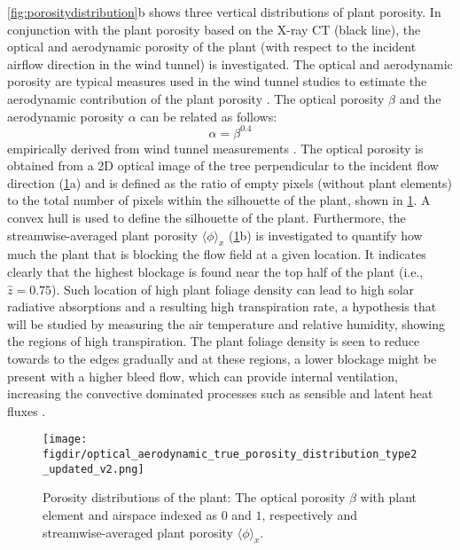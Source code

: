 \cref{fig:porositydistribution}b shows three vertical distributions of plant porosity. In conjunction with the plant porosity based on the X-ray CT (black line), the optical and aerodynamic porosity of the plant (with respect to the incident airflow direction in the wind tunnel) is investigated. The optical and aerodynamic porosity are typical measures used in the wind tunnel studies to estimate the aerodynamic contribution of the plant porosity \citep{Grant1998,Guan2003,Manickathan2018b}. The optical porosity $\beta$ and the aerodynamic porosity $\alpha$ can be related as follows:
\begin{equation}
\alpha = \beta^{0.4}
\end{equation}
empirically derived from wind tunnel measurements \citep{Guan2003}. The optical porosity is obtained from a 2D optical image of the tree perpendicular to the incident flow direction (\cref{fig:porosities}a) and is defined as the ratio of empty pixels (without plant elements) to the total number of pixels within the silhouette of the plant, shown in \cref{fig:porosities}. A convex hull is used to define the silhouette of the plant. Furthermore, the streamwise-averaged plant porosity $\langle \phi \rangle _x$ (\cref{fig:porosities}b) is investigated to quantify how much the plant that is blocking the flow field at a given location. It indicates clearly that the highest blockage is found near the top half of the plant (i.e.,  $\hat{z}=0.75$). Such location of high plant foliage density can lead to high solar radiative absorptions and a resulting high transpiration rate, a hypothesis that will be studied by measuring the air temperature and relative humidity, showing the regions of high transpiration. The plant foliage density is seen to reduce towards to the edges gradually and at these regions, a lower blockage might be present with a higher bleed flow, which can provide internal ventilation, increasing the convective dominated processes such as sensible and latent heat fluxes \citep{Manickathan2018a}. 

\begin{figure}[t]
	\centering
	\texttt{[image: \\figdir/optical\_aerodynamic\_true\_porosity\_distribution\_type2\_updated\_v2.png]}
	\caption{Porosity distributions of the plant:  The optical porosity $\beta$ with plant element and airspace indexed as $0$ and $1$, respectively and  streamwise-averaged plant porosity $\langle \phi \rangle_x$. }
	\label{fig:porosities}
\end{figure}



